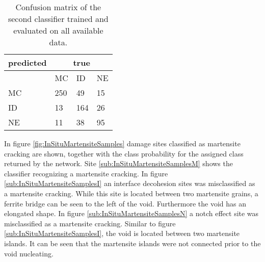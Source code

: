\begin{table}[H]
 \begin{center}
  \begin{tabular}{@{} *4l @{}} \toprule[2pt]
   predicted &  \multicolumn{3}{c}{true}  \\\midrule
    & MC  & ID & NE   \\ 
   MC  & 250 & 49 & 15 \\ 
   ID  & 13 & 164 & 26 \\ 
   NE  & 11 & 38 & 95 \\ \bottomrule[2pt]
  \end{tabular}
 \end{center}
 \caption{Confusion matrix of the second classifier trained and evaluated on all available data.}
   \label{tab:SecondClassifierConfusionMatrixAll}
\end{table}

In figure \ref{fig:InSituMartensiteSamples} damage sites classified as martensite cracking are shown, together with the class probability for the assigned class returned by the network. Site \ref{sub:InSituMartensiteSamplesM} shows the classifier recognizing a martensite cracking. In figure \ref{sub:InSituMartensiteSamplesI} an interface decohesion sites was misclassified as a martensite cracking. While this site is located between two martensite grains, a ferrite bridge can be seen to the left of the void. Furthermore the void has an elongated shape. In figure \ref{sub:InSituMartensiteSamplesN} a notch effect site was misclassified as a martensite cracking. Similar to figure \ref{sub:InSituMartensiteSamplesI}, the void is located between two martensite islands. It can be seen that the martensite islands were not connected prior to the void nucleating.


